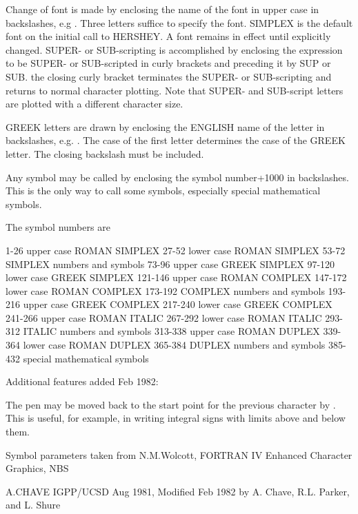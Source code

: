 Change of font is made by enclosing the name of the font in upper case in backslashes, e.\+g . Three letters suffice to specify the font. S\+I\+M\+P\+L\+EX is the default font on the initial call to H\+E\+R\+S\+H\+EY. A font remains in effect until explicitly changed. S\+U\+P\+E\+R-\/ or S\+U\+B-\/scripting is accomplished by enclosing the expression to be S\+U\+P\+E\+R-\/ or S\+U\+B-\/scripted in curly brackets and preceding it by S\+UP or S\+UB. the closing curly bracket terminates the S\+U\+P\+E\+R-\/ or S\+U\+B-\/scripting and returns to normal character plotting. Note that S\+U\+P\+E\+R-\/ and S\+U\+B-\/script letters are plotted with a different character size.

G\+R\+E\+EK letters are drawn by enclosing the E\+N\+G\+L\+I\+SH name of the letter in backslashes, e.\+g. . The case of the first letter determines the case of the G\+R\+E\+EK letter. The closing backslash must be included.

Any symbol may be called by enclosing the symbol number+1000 in backslashes. This is the only way to call some symbols, especially special mathematical symbols.

The symbol numbers are

1-\/26 upper case R\+O\+M\+AN S\+I\+M\+P\+L\+EX 27-\/52 lower case R\+O\+M\+AN S\+I\+M\+P\+L\+EX 53-\/72 S\+I\+M\+P\+L\+EX numbers and symbols 73-\/96 upper case G\+R\+E\+EK S\+I\+M\+P\+L\+EX 97-\/120 lower case G\+R\+E\+EK S\+I\+M\+P\+L\+EX 121-\/146 upper case R\+O\+M\+AN C\+O\+M\+P\+L\+EX 147-\/172 lower case R\+O\+M\+AN C\+O\+M\+P\+L\+EX 173-\/192 C\+O\+M\+P\+L\+EX numbers and symbols 193-\/216 upper case G\+R\+E\+EK C\+O\+M\+P\+L\+EX 217-\/240 lower case G\+R\+E\+EK C\+O\+M\+P\+L\+EX 241-\/266 upper case R\+O\+M\+AN I\+T\+A\+L\+IC 267-\/292 lower case R\+O\+M\+AN I\+T\+A\+L\+IC 293-\/312 I\+T\+A\+L\+IC numbers and symbols 313-\/338 upper case R\+O\+M\+AN D\+U\+P\+L\+EX 339-\/364 lower case R\+O\+M\+AN D\+U\+P\+L\+EX 365-\/384 D\+U\+P\+L\+EX numbers and symbols 385-\/432 special mathematical symbols

Additional features added Feb 1982\+:

The pen may be moved back to the start point for the previous character by . This is useful, for example, in writing integral signs with limits above and below them.

Symbol parameters taken from N.\+M.\+Wolcott, F\+O\+R\+T\+R\+AN IV Enhanced Character Graphics, N\+BS

A.\+C\+H\+A\+VE I\+G\+P\+P/\+U\+C\+SD Aug 1981, Modified Feb 1982 by A. Chave, R.\+L. Parker, and L. Shure

